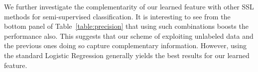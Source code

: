 We further investigate the complementarity of our learned feature with
other SSL methods for semi-supervised classification. It is
interesting to see from the bottom panel of
Table~\ref{table:precision} that using such combinations boosts the
performance also. This suggests that our scheme of exploiting
unlabeled data and the previous ones doing so capture complementary
information. However, using the standard Logistic Regression generally
yields the best results for our learned feature.

 





